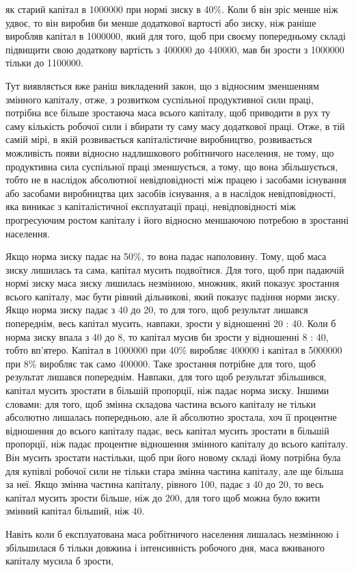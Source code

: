 як старий капітал в 1000000 при нормі зиску в 40\%. Коли б він
зріс менше ніж удвоє, то він виробив би менше додаткової
вартості або зиску, ніж раніше виробляв капітал в 1000000,
який для того, щоб при своєму попередньому складі підвищити
свою додаткову вартість з 400000 до 440000, мав би зрости
з 1000000 тільки до 1100000.

Тут виявляється вже раніш викладений закон, що з відносним
зменшенням змінного капіталу, отже, з розвитком суспільної
продуктивної сили праці, потрібна все більше зростаюча маса
всього капіталу, щоб приводити в рух ту саму кількість робочої
сили і вбирати ту саму масу додаткової праці. Отже, в тій
самій мірі, в якій розвивається капіталістичне виробництво, розвивається
можливість появи відносно надлишкового робітничого
населення, не тому, що продуктивна сила суспільної праці зменшується,
а тому, що вона збільшується, тобто не в наслідок
абсолютної невідповідності між працею і засобами існування
або засобами виробництва цих засобів існування, а в наслідок
невідповідності, яка виникає з капіталістичної експлуатації праці,
невідповідності між прогресуючим ростом капіталу і його відносно
меншаючою потребою в зростанні населення.

Якщо норма зиску падає на 50\%, то вона падає наполовину.
Тому, щоб маса зиску лишилась та сама, капітал мусить подвоїтися.
Для того, щоб при падаючій нормі зиску маса зиску лишилась
незмінною, множник, який показує зростання всього капіталу,
має бути рівний дільникові, який показує падіння норми зиску.
Якщо норма зиску падає з 40 до 20, то для того, щоб результат
лишався попереднім, весь капітал мусить, навпаки, зрости у відношенні
20 : 40. Коли б норма зиску впала з 40 до 8, то капітал
мусив би зрости у відношенні 8 : 40, тобто вп’ятеро. Капітал
в 1000000 при 40\% виробляє 400000 і капітал в 5000000 при 8\%
виробляє так само 400000. Таке зростання потрібне для того, щоб
результат лишався попереднім. Навпаки, для того щоб результат
збільшився, капітал мусить зростати в більшій пропорції, ніж
падає норма зиску. Іншими словами: для того, щоб змінна складова
частина всього капіталу не тільки абсолютно лишалась
попередньою, але й абсолютно зростала, хоч її процентне відношення
до всього капіталу падає, весь капітал мусить зростати
в більшій пропорції, ніж падає процентне відношення змінного
капіталу до всього капіталу. Він мусить зростати настільки,
щоб при його новому складі йому потрібна була для купівлі
робочої сили не тільки стара змінна частина капіталу, але ще
більша за неї. Якщо змінна частина капіталу, рівного 100,
падає з 40 до 20, то весь капітал мусить зрости більше, ніж до
200, для того щоб можна було вжити змінний капітал більший,
ніж 40.

Навіть коли б експлуатована маса робітничого населення
лишалась незмінною і збільшилася б тільки довжина і інтенсивність
робочого дня, маса вживаного капіталу мусила б зрости,
